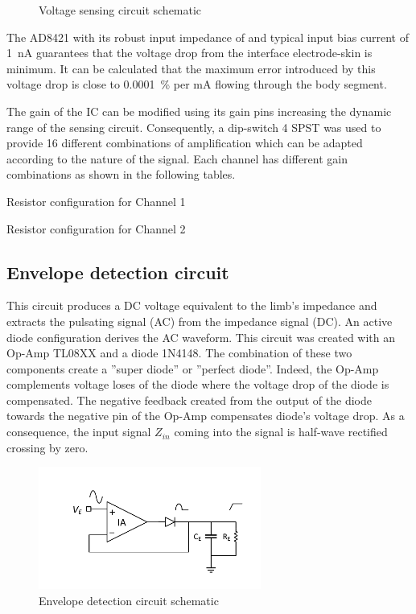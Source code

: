\begin{figure}[!htpb]
	\centering
    \caption{Voltage sensing circuit schematic}
    \label{fig:sensing}
\end{figure}

The AD8421\cite{ad:AD8421} with its robust input impedance of and typical input bias current of \SI{1}{\nA} guarantees that the voltage drop from the interface electrode-skin is minimum. It can be calculated that the maximum error introduced by this voltage drop is close to \SI{0.0001}{\percent} per mA flowing through the body segment. 

The gain of the IC can be modified using its gain pins increasing the dynamic range of the sensing circuit. Consequently, a dip-switch 4 SPST was used to provide 16 different combinations of amplification which can be adapted according to the nature of the signal. Each channel has different gain combinations as shown in the following tables.

\begin{table}
    \label{tbl:rch1}
    \caption{Resistor configuration for Channel 1}
\end{table} 

\begin{table}
    \label{tbl:rch2}
    \caption{Resistor configuration for Channel 2}
\end{table} 


\subsection{Envelope detection circuit}
This circuit produces a DC voltage equivalent to the limb's impedance and extracts the pulsating signal (AC) from the impedance signal (DC). An active diode configuration derives the AC waveform. This circuit was created with an Op-Amp TL08XX\cite{ti:TL08xx} and a diode 1N4148. The combination of these two components create a ''super diode'' or ''perfect diode''. Indeed, the Op-Amp complements voltage loses of the diode where the voltage drop of the diode is compensated. The negative feedback created from the output of the diode towards the negative pin of the Op-Amp compensates diode's voltage drop. As a consequence, the input signal $Z_{in}$ coming into the signal is half-wave rectified crossing by zero. 

\begin{figure}[!htpb]
	\centering
	\includegraphics[width=7.3cm,keepaspectratio]{figure5}
 	\caption{Envelope detection circuit schematic}
    \label{fig:envelope}
\end{figure}

